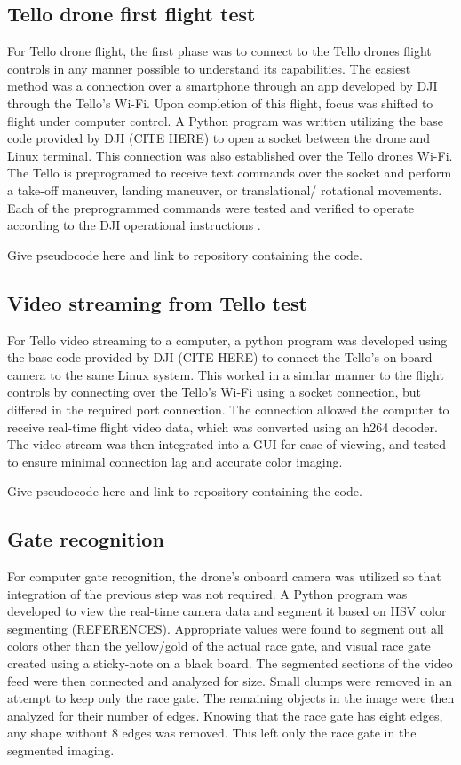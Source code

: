 \documentclass[onecolumn,10pt]{IEEEtran}
\begin{document}
\subsection{Tello drone first flight test}
For Tello drone flight, the first phase was to connect to the Tello drones flight controls in any manner possible to understand its capabilities. The easiest method was a connection over a smartphone through an app developed by DJI through the Tello’s Wi-Fi. Upon completion of this flight, focus was shifted to flight under computer control. A Python program was written utilizing the base code provided by DJI (CITE HERE) to open a socket between the drone and Linux terminal. This connection was also established over the Tello drones Wi-Fi. The Tello is preprogramed to receive text commands over the socket and perform a take-off maneuver, landing maneuver, or translational/ rotational movements. Each of the preprogrammed commands were tested and verified to operate according to the DJI operational instructions \cite{tello-manual}.

Give pseudocode here and link to repository containing the code. 

\subsection{Video streaming from Tello test}
For Tello video streaming to a computer, a python program was developed using the base code provided by DJI (CITE HERE) to connect the Tello’s on-board camera to the same Linux system. This worked in a similar manner to the flight controls by connecting over the Tello’s Wi-Fi using a socket connection, but differed in the required port connection. The connection allowed the computer to receive real-time flight video data, which was converted using an h264 decoder. The video stream was then integrated into a GUI for ease of viewing, and tested to ensure minimal connection lag and accurate color imaging.

Give pseudocode here and link to repository containing the code. 

\subsection{Gate recognition}
For computer gate recognition, the drone's onboard camera was utilized so that integration of the previous step was not required. A Python program was developed to view the real-time camera data and segment it based on HSV color segmenting (REFERENCES). Appropriate values were found to segment out all colors other than the yellow/gold of the actual race gate, and visual race gate created using a sticky-note on a black board. The segmented sections of the video feed were then connected and analyzed for size. Small clumps were removed in an attempt to keep only the race gate. The remaining objects in the image were then analyzed for their number of edges. Knowing that the race gate has eight edges, any shape without 8 edges was removed. This left only the race gate in the segmented imaging.
\end{document}
